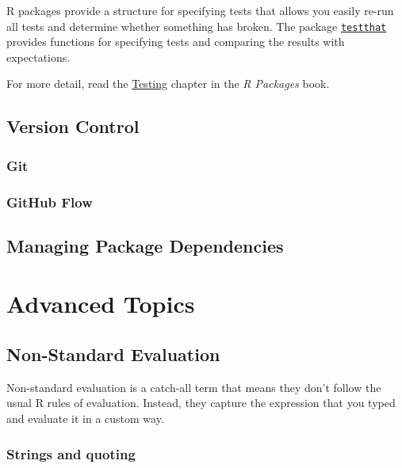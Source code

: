 \documentclass[]{book}
\begin{document}
R packages provide a structure for specifying tests that allows you easily re-run all tests and
determine whether something has broken. The package \href{http://testthat.r-lib.org/}{\texttt{testthat}}
provides functions for specifying tests and comparing the results with expectations.

For more detail, read the \href{http://r-pkgs.had.co.nz/tests.html}{Testing} chapter in
the \emph{R Packages} book.

\hypertarget{version-control}{%
\section{Version Control}\label{version-control}}

\hypertarget{git}{%
\subsection{Git}\label{git}}

\hypertarget{github-flow}{%
\subsection{GitHub Flow}\label{github-flow}}

\hypertarget{managing-package-dependencies}{%
\section{Managing Package Dependencies}\label{managing-package-dependencies}}

\hypertarget{advanced}{%
\chapter{Advanced Topics}\label{advanced}}

\hypertarget{non-standard-evaluation}{%
\section{Non-Standard Evaluation}\label{non-standard-evaluation}}

Non-standard evaluation is a catch-all term that means they don't follow the usual R rules
of evaluation. Instead, they capture the expression that you typed and evaluate it in a
custom way.

\hypertarget{strings-and-quoting}{%
\subsection{Strings and quoting}\label{strings-and-quoting}}
\end{document}
